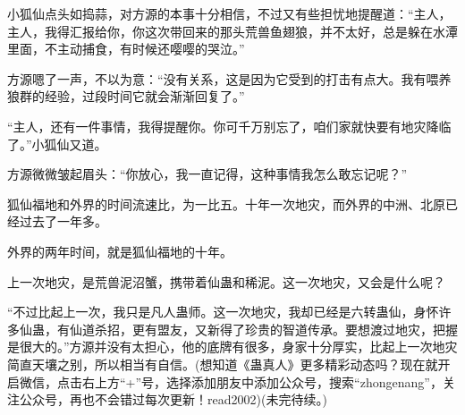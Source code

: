 \begin{this_body}
小狐仙点头如捣蒜，对方源的本事十分相信，不过又有些担忧地提醒道：“主人，主人，我得汇报给你，你这次带回来的那头荒兽鱼翅狼，并不太好，总是躲在水潭里面，不主动捕食，有时候还嘤嘤的哭泣。”

方源嗯了一声，不以为意：“没有关系，这是因为它受到的打击有点大。我有喂养狼群的经验，过段时间它就会渐渐回复了。”

“主人，还有一件事情，我得提醒你。你可千万别忘了，咱们家就快要有地灾降临了。”小狐仙又道。

方源微微皱起眉头：“你放心，我一直记得，这种事情我怎么敢忘记呢？”

狐仙福地和外界的时间流速比，为一比五。十年一次地灾，而外界的中洲、北原已经过去了一年多。

外界的两年时间，就是狐仙福地的十年。

上一次地灾，是荒兽泥沼蟹，携带着仙蛊和稀泥。这一次地灾，又会是什么呢？

“不过比起上一次，我只是凡人蛊师。这一次地灾，我却已经是六转蛊仙，身怀许多仙蛊，有仙道杀招，更有盟友，又新得了珍贵的智道传承。要想渡过地灾，把握是很大的。”方源并没有太担心，他的底牌有很多，身家十分厚实，比起上一次地灾简直天壤之别，所以相当有自信。(想知道《蛊真人》更多精彩动态吗？现在就开启微信，点击右上方“+”号，选择添加朋友中添加公众号，搜索“zhongenang”，关注公众号，再也不会错过每次更新！read2002)(未完待续。)

\end{this_body}

